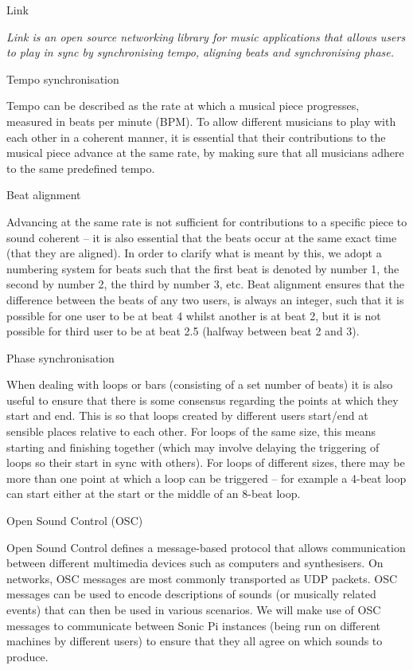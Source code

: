 \documentclass[12pt,a4paper,twoside]{article}
\begin{document}
\Large
Link

\normalsize
\emph{Link is an open source networking library for music applications that allows users to play in sync by synchronising tempo, aligning beats and synchronising phase.}

\large
Tempo synchronisation

\normalsize
Tempo can be described as the rate at which a musical piece progresses, measured in beats per minute (BPM). To allow different musicians to play with each other in a coherent manner, it is essential that their contributions to the musical piece advance at the same rate, by making sure that all musicians adhere to the same predefined tempo.

\large
Beat alignment

\normalsize
Advancing at the same rate is not sufficient for contributions to a specific piece to sound coherent -- it is also essential that the beats occur at the same exact time (that they are aligned). In order to clarify what is meant by this, we adopt a numbering system for beats such that the first beat is denoted by number 1, the second by number 2, the third by number 3, etc. Beat alignment ensures that the difference between the beats of any two users, is always an integer, such that it is possible for one user to be at beat 4 whilst another is at beat 2, but it is not possible for third user to be at beat 2.5 (halfway between beat 2 and 3).

\large
Phase synchronisation

\normalsize
When dealing with loops or bars (consisting of a set number of beats) it is also useful to ensure that there is some consensus regarding the points at which they start and end. This is so that loops created by different users start/end at sensible places relative to each other. For loops of the same size, this means starting and finishing together (which may involve delaying the triggering of loops so their start in sync with others). For loops of different sizes, there may be more than one point at which a loop can be triggered -- for example a 4-beat loop can start either at the start or the middle of an 8-beat loop.

\Large
Open Sound Control (OSC)

\normalsize
Open Sound Control defines a message-based protocol that allows communication between different multimedia devices such as computers and synthesisers. On networks, OSC messages are most commonly transported as UDP packets. OSC messages can be used to encode descriptions of sounds (or musically related events) that can then be used in various scenarios. We will make use of OSC messages to communicate between Sonic Pi instances (being run on different machines by different users) to ensure that they all agree on which sounds to produce.
\end{document}
